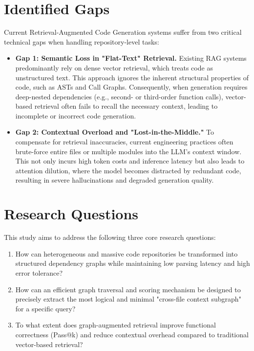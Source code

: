 \documentclass[11pt, a4paper]{article}
\begin{document}
\section{Identified Gaps}
Current Retrieval-Augmented Code Generation systems suffer from two critical technical gaps when handling repository-level tasks:

\begin{itemize}
    \item \textbf{Gap 1: Semantic Loss in "Flat-Text" Retrieval.} Existing RAG systems predominantly rely on dense vector retrieval, which treats code as unstructured text. This approach ignores the inherent structural properties of code, such as ASTs and Call Graphs. Consequently, when generation requires deep-nested dependencies (e.g., second- or third-order function calls), vector-based retrieval often fails to recall the necessary context, leading to incomplete or incorrect code generation.

    \item \textbf{Gap 2: Contextual Overload and "Lost-in-the-Middle."} To compensate for retrieval inaccuracies, current engineering practices often brute-force entire files or multiple modules into the LLM's context window. This not only incurs high token costs and inference latency but also leads to attention dilution, where the model becomes distracted by redundant code, resulting in severe hallucinations and degraded generation quality.
\end{itemize}

\section{Research Questions}
This study aims to address the following three core research questions:
\begin{enumerate}[label=RQ\arabic*:]
    \item How can heterogeneous and massive code repositories be transformed into structured dependency graphs while maintaining low parsing latency and high error tolerance?
    \item How can an efficient graph traversal and scoring mechanism be designed to precisely extract the most logical and minimal "cross-file context subgraph" for a specific query?
    \item To what extent does graph-augmented retrieval improve functional correctness (Pass@k) and reduce contextual overhead compared to traditional vector-based retrieval?
\end{enumerate}
\end{document}
